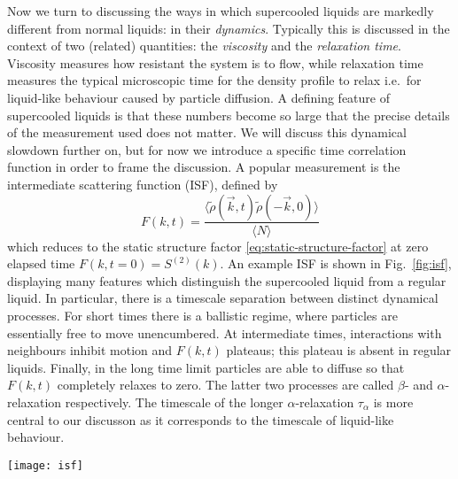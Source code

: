 Now we turn to discussing the ways in which supercooled liquids are markedly different from normal liquids: in their \emph{dynamics}.
Typically this is discussed in the context of two (related) quantities: the \emph{viscosity} and the \emph{relaxation time}.
Viscosity measures how resistant the system is to flow, while relaxation time measures the typical microscopic time for the density profile to relax i.e.\ for liquid-like behaviour caused by particle diffusion.
A defining feature of supercooled liquids is that these numbers become so large that the precise details of the measurement used does not matter.
We will discuss this dynamical slowdown further on, but for now we introduce a specific time correlation function in order to frame the discussion.
A popular measurement is the intermediate scattering function (ISF), defined by \cite{JanssenFP2018}
\begin{equation}\label{eq:isf}
  F(k, t)
  =
  \frac{
    \big\langle \tilde{\rho}(\vec{k}, t) \tilde{\rho}(-\vec{k}, 0) \big\rangle
  }{
    \langle N \rangle
  }
\end{equation}
which reduces to the static structure factor \eqref{eq:static-structure-factor} at zero elapsed time $F(k, t=0) = S^{(2)}(k)$.
An example ISF is shown in Fig.\ \ref{fig:isf}, displaying many features which distinguish the supercooled liquid from a regular liquid.
In particular, there is a timescale separation between distinct dynamical processes.
For short times there is a ballistic regime, where particles are essentially free to move unencumbered.
At intermediate times, interactions with neighbours inhibit motion and $F(k,t)$ plateaus; this plateau is absent in regular liquids.
Finally, in the long time limit particles are able to diffuse so that $F(k,t)$ completely relaxes to zero.
The latter two processes are called $\beta$- and $\alpha$-relaxation respectively.
The timescale of the longer $\alpha$-relaxation $\tau_\alpha$ is more central to our discusson as it corresponds to the timescale of liquid-like behaviour.

\begin{SCfigure}
  \texttt{[image: isf]}
  \caption[Intermediate scattering function in a supercooled liquid]{
    Typical intermediate scattering function in a supercooled liquid.
    The power law predictions are from mode-coupling theory.
    Reproduced from Ref.\ \cite{JanssenFP2018}.
  }
  \label{fig:isf}
\end{SCfigure}


